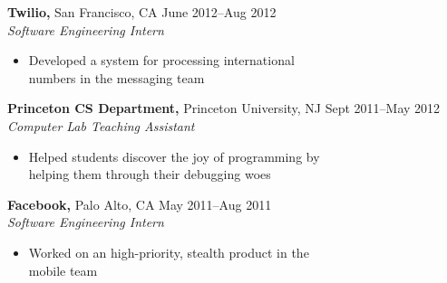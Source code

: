 \documentclass[margin]{res}
\begin{document}
\begin{resume}
 {\bf Twilio,} San Francisco, CA \hfill June 2012--Aug 2012 \\
 {\it Software Engineering Intern}
 \begin{itemize} \itemsep -2pt  %
 \item Developed a system for processing international \\
   numbers in the messaging team
 \end{itemize}

 {\bf Princeton CS Department,} Princeton University, NJ \hfill Sept 2011--May 2012 \\
 {\it Computer Lab Teaching Assistant}
 \begin{itemize} \itemsep -2pt  %
 \item Helped students discover the joy of programming by \\
   helping them through their debugging woes
 \end{itemize}

 {\bf Facebook,} Palo Alto, CA \hfill May 2011--Aug 2011 \\
 {\it Software Engineering Intern}
 \begin{itemize} \itemsep -2pt  %
 \item Worked on an high-priority, stealth product in the \\
   mobile team
 \end{itemize}




\end{resume}
\end{document}
